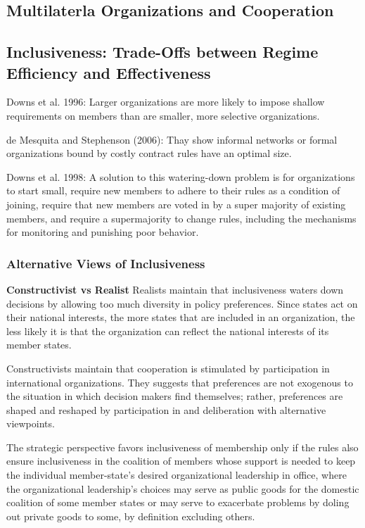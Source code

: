 \subsection{Multilaterla Organizations and Cooperation}

\subsection{Inclusiveness: Trade-Offs between Regime Efficiency and Effectiveness}
Downs et al. 1996: Larger organizations are more likely to impose shallow requirements on members than are smaller, more selective organizations.

de Mesquita and Stephenson (2006): Thay show informal networks or formal organizations bound by costly contract rules have an optimal size.

Downs et al. 1998: A solution to this watering-down problem is for organizations to start small, require new members to adhere to their rules as a condition of joining, require that new members are voted in by a super majority of existing members, and require a supermajority to change rules, including the mechanisms for monitoring and punishing poor behavior.

\subsubsection{Alternative Views of Inclusiveness}

\textbf{Constructivist vs Realist}
Realists maintain that inclusiveness waters down decisions by allowing too much diversity in policy preferences. Since states act on their national interests, the more states that are included in an organization, the less likely it is that the organization can reflect the national interests of its member states.

Constructivists maintain that cooperation is stimulated by participation in international organizations. They suggests that preferences are not exogenous to the situation in which decision makers find themselves; rather, preferences are shaped and reshaped by participation in and deliberation with alternative viewpoints.

The strategic perspective favors inclusiveness of membership only if the rules also ensure inclusiveness in the coalition of members whose support is needed to keep the individual member-state’s desired organizational leadership in office, where the organizational leadership’s choices may serve as public goods for the domestic coalition of some member states or may serve to exacerbate problems by doling out private goods to some, by definition excluding others.

